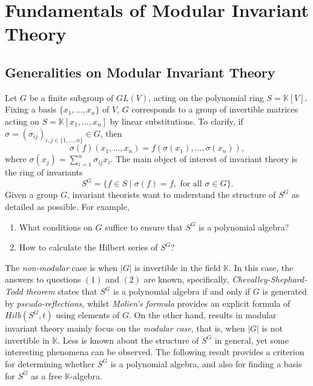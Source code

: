 \documentclass[12pt,a4paper]{report}
\theoremstyle{definition}
\theoremstyle{remark}
\theoremstyle{definition}
\begin{document}
\chapter{Fundamentals of Modular Invariant Theory}\label{chapter:invariant_theory}
\section{Generalities on Modular Invariant Theory}\label{sec: invariant_theory}
Let $G$ be a finite subgroup of $GL(V)$, acting on the polynomial ring $S = \mathbb{K}[V]$. Fixing a basis $\{x_1, \ldots, x_n\}$ of $V$, $G$ corresponds to a group of invertible matrices acting on $S = \mathbb{K}[x_1, \ldots, x_n]$ by linear substitutions. To clarify, if $\sigma = (\sigma_{ij})_{i, j\in \{1, \ldots, n\}}\in G$, then
\begin{equation*}
    \sigma(f)(x_1, \ldots, x_n) = f(\sigma (x_1), \ldots, \sigma (x_n)),
\end{equation*}
where $\sigma(x_j) = \sum\limits_{i=1}^{n}\sigma_{ij}x_i$.\smallbreak
The main object of interest of invariant theory is the ring of invariants 
\begin{equation*}
    S^G = \{f\in S\mid \sigma(f) = f, \text{ for all } \sigma\in G\}.
\end{equation*}
Given a group $G$, invariant theorists want to understand the structure of $S^G$ as detailed as possible. For example, 
\begin{enumerate}
    \item What conditions on $G$ suffice to ensure that $S^G$ is a polynomial algebra?
    \item How to calculate the Hilbert series of $S^G$? 
\end{enumerate}
The \emph{non-modular} case is when $|G|$ is invertible in the field $\mathbb{K}$. In this case, the answers to questions $(1)$ and $(2)$ are known, specifically, \emph{Chevalley-Shephard-Todd theorem} \cite[$\S$ 18-1]{kane2001reflection} states that $S^G$ is a polynomial algebra if and only if $G$ is generated by \emph{pseudo-reflections}, whilst \emph{Molien's formula} \cite[$\S$ 17-2]{kane2001reflection} provides an explicit formula of $Hilb(S^G, t)$ using elements of $G$.\smallbreak
On the other hand, results in modular invariant theory mainly focus on the \emph{modular case}, that is, when $|G|$ is not invertible in $\mathbb{K}$. Less is known about the structure of $S^G$ in general, yet some interesting phenomena can be observed. The following result provides a criterion for determining whether $S^G$ is a polynomial algebra, and also for finding a basis for $S^G$ as a free $\mathbb{K}$-algebra.
\end{document}
